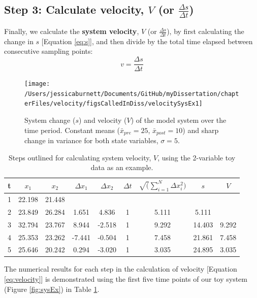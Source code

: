 \documentclass[12pt,twoside,openany]{reedthesis}
\begin{document}
\hypertarget{step-3-calculate-velocity-v-or-fracdelta-sdelta-t}{%
\subsection{\texorpdfstring{Step 3: Calculate velocity, \(V\) (or \(\frac{\Delta s}{\Delta t}\))}{Step 3: Calculate velocity, V (or \textbackslash frac\{\textbackslash Delta s\}\{\textbackslash Delta t\})}}\label{step-3-calculate-velocity-v-or-fracdelta-sdelta-t}}

Finally, we calculate the \textbf{system velocity}, \(V\) (or \(\frac{\Delta s}{\Delta t}\)), by first calculating the change in \(s\) {[}Equation \eqref{eq:s}{]}, and then divide by the total time elapsed between consecutive sampling points:
\begin{equation}
 v = \frac {\Delta s}{\Delta t} 
\label{eq:velocity}
\end{equation}
\begin{figure}
\texttt{[image: /Users/jessicaburnett/Documents/GitHub/myDissertation/chapterFiles/velocity/figsCalledInDiss/velocitySysEx1]} \caption{System change ($s$) and velocity ($V$) of the model system over the time period. Constant means ($\bar{x}_{pre}=25$, $\bar{x}_{post}=10$) and sharp change in variance for both state variables, $\sigma =5$.}\label{fig:velocSysEx1}
\end{figure}
\begin{table}[t]

\caption{\label{tab:distTab}Steps outlined for calculating system velocity, $V$, using the 2-variable toy data as an example.}
\centering
\begin{tabular}{ccccccccc}
\toprule
t & $x_1$ & $x_2$ & $\Delta x_1$ & $\Delta x_2$ & $\Delta t$ & $\sqrt(\sum_{i=1}^N \Delta x_i^2) $ & $s$ & $V$\\
\midrule
1 & 22.198 & 21.448 &  &  &  &  &  & \\
2 & 23.849 & 26.284 & 1.651 & 4.836 & 1 & 5.111 & 5.111 & \\
3 & 32.794 & 23.767 & 8.944 & -2.518 & 1 & 9.292 & 14.403 & 9.292\\
4 & 25.353 & 23.262 & -7.441 & -0.504 & 1 & 7.458 & 21.861 & 7.458\\
5 & 25.646 & 20.242 & 0.294 & -3.020 & 1 & 3.035 & 24.895 & 3.035\\
\bottomrule
\end{tabular}
\end{table}
The numerical results for each step in the calculation of velocity {[}Equation \eqref{eq:velocity}{]} is demonstrated using the first five time points of our toy system (Figure \ref{fig:sysEx}) in Table \ref{tab:distTab}.
\end{document}
